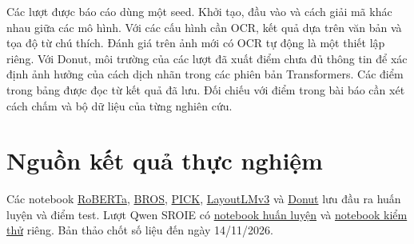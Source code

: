 Các lượt được báo cáo dùng một seed. Khởi tạo, đầu vào và cách giải mã khác nhau giữa các mô hình. Với các cấu hình cần OCR, kết quả dựa trên văn bản và tọa độ từ chú thích. Đánh giá trên ảnh mới có OCR tự động là một thiết lập riêng. Với Donut, môi trường của các lượt đã xuất điểm chưa đủ thông tin để xác định ảnh hưởng của cách dịch nhãn trong các phiên bản Transformers. Các điểm trong bảng được đọc từ kết quả đã lưu. Đối chiếu với điểm trong bài báo cần xét cách chấm và bộ dữ liệu của từng nghiên cứu.

\section{Nguồn kết quả thực nghiệm}
Các notebook \href{https://www.kaggle.com/code/vhngthnh/roberta-model}{RoBERTa}, \href{https://www.kaggle.com/code/vhngthnh/bros-model}{BROS}, \href{https://www.kaggle.com/code/vhngthnh/pick-model}{PICK}, \href{https://www.kaggle.com/code/vhngthnh/layoutlmv3-model}{LayoutLMv3} và \href{https://www.kaggle.com/code/vhngthnh/donut-model}{Donut} lưu đầu ra huấn luyện và điểm test. Lượt Qwen SROIE có \href{https://www.kaggle.com/code/phvngtngtm/reconia-qwen-number6-sroie-train}{notebook huấn luyện} và \href{https://www.kaggle.com/code/phvngtngtm/reconia-qwen-number6-sroie-test}{notebook kiểm thử} riêng. Bản thảo chốt số liệu đến ngày 14/11/2026.
